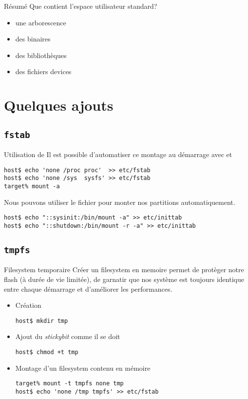 \begin{frame}{Résumé}
  Que contient l'espace utilisateur standard?
  \begin{itemize}
  \item une arborescence
  \item des binaires
  \item des bibliothèques
  \item des fichiers devices
  \end{itemize}
\end{frame}

\section{Quelques ajouts}
 
\subsection{\texttt{fstab}}

\begin{frame}[fragile=singleslide]{Utilisation de }
  Il  est   possible  d'automatiser  ce  montage   au  démarrage  avec
   et 
  \begin{lstlisting}
host$ echo 'none /proc proc'  >> etc/fstab
host$ echo 'none /sys  sysfs' >> etc/fstab
target% mount -a
  \end{lstlisting}

  Nous pouvons utiliser le  fichier  pour monter nos
  partitions automatiquement.
  \begin{lstlisting}
host$ echo "::sysinit:/bin/mount -a" >> etc/inittab 
host$ echo "::shutdown:/bin/mount -r -a" >> etc/inittab 
  \end{lstlisting}
\end{frame}

\subsection{\texttt{tmpfs}}

\begin{frame}[fragile=singleslide]{Filesystem temporaire}
  Créer un  filesystem en  memoire permet de  protèger notre  flash (à
  durée  de vie  limitée), de  garnatir que  nos système  est toujours
  identique entre chaque démarrage et d'améliorer les performances.
  \begin{itemize}
    \item Création
    \begin{lstlisting}
host$ mkdir tmp
    \end{lstlisting}
  \item Ajout du \emph{stickybit} comme il se doit
    \begin{lstlisting}
host$ chmod +t tmp
    \end{lstlisting}
  \item Montage d'un filesystem contenu en mémoire
    \begin{lstlisting}
target% mount -t tmpfs none tmp
host$ echo 'none /tmp tmpfs' >> etc/fstab
    \end{lstlisting}
  \end{itemize}
\end{frame}

